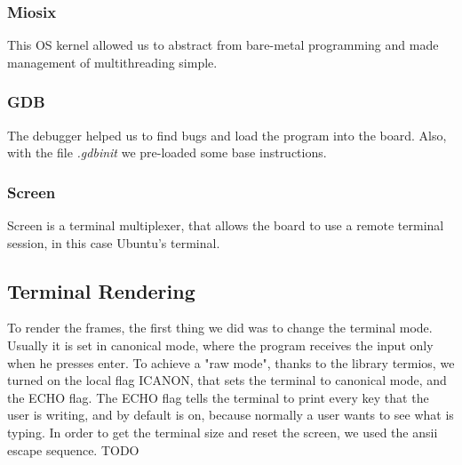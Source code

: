 \documentclass{article}
\begin{document}
\subsubsection{Miosix}
This OS kernel allowed us to abstract from bare-metal programming and made management of multithreading simple.
\subsubsection{GDB}
The debugger helped us to find bugs and load the program into the board. Also, with the file \emph{.gdbinit} we pre-loaded some base instructions.
\subsubsection{Screen}
Screen is a terminal multiplexer, that allows the board to use a remote terminal session, in this case Ubuntu's terminal.

\subsection{Terminal Rendering}
\label{terminal-rendering}
To render the frames, the first thing we did was to change the terminal mode. Usually it is set in canonical mode, where the program receives the input only when he presses enter.
To achieve a "raw mode", thanks to the library termios, we turned on the local flag ICANON, that sets the terminal to canonical mode, and the ECHO flag.
The ECHO flag tells the terminal to print every key that the user is writing, and by default is on, because normally a user wants to see what is typing.
In order to get the terminal size and reset the screen, we used the ansii escape sequence. TODO
\end{document}
